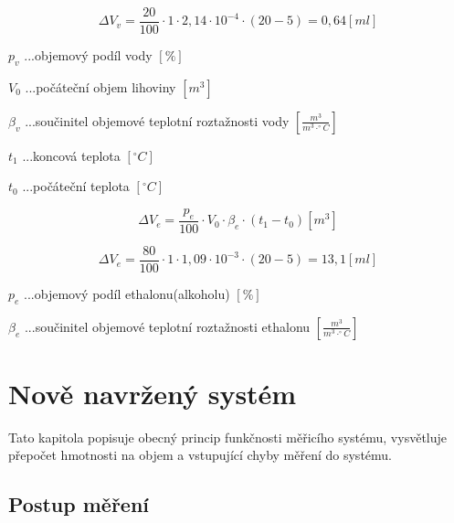 \[\Delta V_v = \frac{20}{100} \cdot 1 \cdot  2,14 \cdot 10^{-4} \cdot (20 - 5) = 0,64 \left[ml\right]\]

\(p_v\) ...objemový podíl vody \([\%]\) 

\(V_0\) ...počáteční objem lihoviny \([m^3]\)

\(\beta_v\) ...součinitel objemové teplotní roztažnosti vody \([\frac{m^3}{m^3 \cdot ^\circ C}]\)

\(t_1\) ...koncová teplota \([^\circ C]\)

\(t_0\) ...počáteční teplota \([^\circ C]\)

\begin{equation}
    \Delta V_e = \frac{p_e}{100} \cdot V_0 \cdot \beta_e \cdot (t_1 - t_0)\left[m^3\right] \label{objem_kapalina}
\end{equation}

\[\Delta V_e = \frac{80}{100} \cdot 1 \cdot  1,09 \cdot 10^{-3} \cdot (20 - 5) = 13,1 \left[ml\right]\]

\(p_e\) ...objemový podíl ethalonu(alkoholu) \([\%]\) 

\(\beta_e\) ...součinitel objemové teplotní roztažnosti ethalonu \([\frac{m^3}{m^3 \cdot ^\circ C}]\)










\chapter*{Nově navržený systém}
Tato kapitola popisuje obecný princip funkčnosti měřicího systému, vysvětluje přepočet hmotnosti na objem a vstupující chyby měření do systému.

\section{Postup měření}


